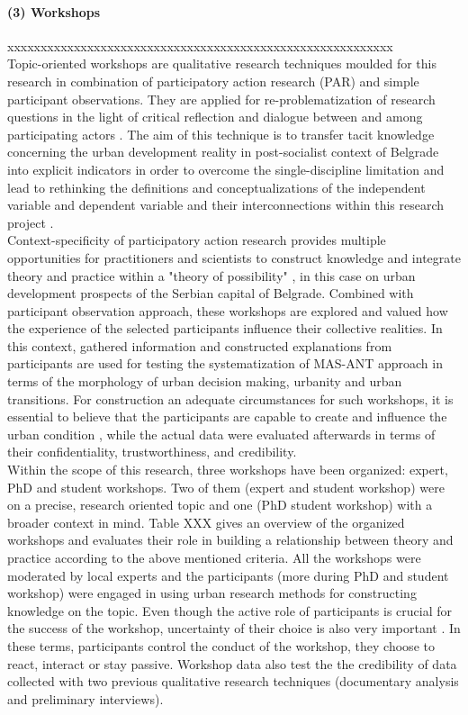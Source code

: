 \documentclass[11pt]{report}
\begin{document}
\paragraph{(3) Workshops} xxxxxxxxxxxxxxxxxxxxxxxxxxxxxxxxxxxxxxxxxxxxxxxxxxxxxxxxxx
\\
Topic-oriented workshops are qualitative research techniques moulded for this research in combination of participatory action research (PAR) and simple participant observations. They are applied for re-problematization of research questions in the light of critical reflection and dialogue between and among participating actors . The aim of this technique is to transfer tacit knowledge concerning the urban development reality in post-socialist context of Belgrade into explicit indicators in order to overcome the single-discipline limitation and lead to rethinking the definitions and conceptualizations of the independent variable and dependent variable and their interconnections within this research project . 
\\
Context-specificity of participatory action research provides multiple opportunities for practitioners and scientists to construct knowledge and integrate theory and practice within a "theory of possibility" , in this case on urban development prospects of the Serbian capital of Belgrade. Combined with participant observation approach, these workshops are explored and valued how the experience of the selected participants influence their collective  realities. In this context, gathered information and constructed explanations from participants are used for testing the systematization of MAS-ANT approach in terms of the morphology of urban decision making, urbanity and urban transitions. For construction an adequate circumstances for such workshops, it is essential to believe that the participants are capable to create and influence the urban condition , while the actual data were evaluated afterwards in terms of their
confidentiality, trustworthiness, and credibility.
\\
Within the scope of this research, three workshops have been organized: expert, PhD and student workshops. Two of them (expert and student workshop) were on a precise, research oriented topic and one (PhD student workshop) with a broader context in mind. Table XXX gives an overview of the organized workshops and evaluates their role in building a relationship between theory and practice according to the above mentioned criteria. All the workshops were moderated by local experts and the participants (more during PhD and student workshop) were engaged in using urban research methods for  constructing  knowledge on the topic. Even though the active role of participants is crucial for the success of the workshop, uncertainty of their choice is also very important . In these terms, participants control the conduct of the workshop, they choose to react, interact or stay passive. Workshop data also test the the credibility of data collected with two previous qualitative research techniques (documentary analysis and preliminary interviews).
\end{document}
